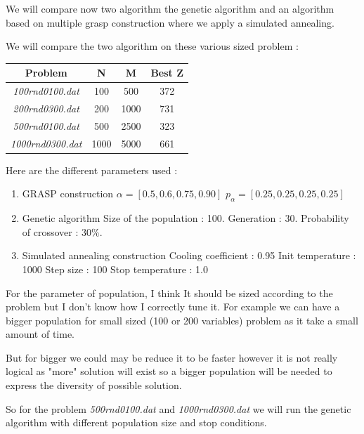 \documentclass[12pt]{article}
\begin{document}
	We will compare now two algorithm the genetic algorithm and an algorithm based on multiple grasp construction where we apply a simulated annealing.
	
	We will compare the two algorithm on these various sized problem :
	\begin{center}
		\begin{tabular}{|c|c|c|c|}
			\hline
			Problem & N & M & Best Z \\
			\hline
			\textit{100rnd0100.dat} & 100 & 500 & 372 \\
			\hline
			\textit{200rnd0300.dat} & 200 & 1000 & 731 \\ 
			\hline
			\textit{500rnd0100.dat} & 500 & 2500 & 323  \\
			\hline
			\textit{1000rnd0300.dat} & 1000 & 5000 & 661 \\
			\hline
		\end{tabular}
	\end{center}
		
	Here are the different parameters used :
	\begin{enumerate}
		\item GRASP construction
		\subitem $ \alpha = [0.5,0.6,0.75,0.90]$
		\subitem $ p_{\alpha} = [0.25,0.25,0.25,0.25]$
		\item Genetic algorithm
		\subitem Size of the population : 100.
		\subitem Generation : 30.
		\subitem Probability of crossover : 30\%.
		\item Simulated annealing
		 construction
		\subitem Cooling coefficient : 0.95
		\subitem Init temperature : 1000
		\subitem Step size : 100
		\subitem Stop temperature : 1.0
	\end{enumerate}
	For the parameter of population, I think It should be sized according to the problem but I don't know how I correctly tune it. For example we can have a bigger population for small sized (100 or 200 variables) problem as it take a small amount of time. 
	
	But for bigger we could may be reduce it to be faster however it is not really logical as "more" solution will exist so a bigger population will be needed to express the diversity of possible solution.
	
	So for the problem \textit{500rnd0100.dat} and \textit{1000rnd0300.dat} we will run the genetic algorithm with different population size and stop conditions.
	
\end{document}
